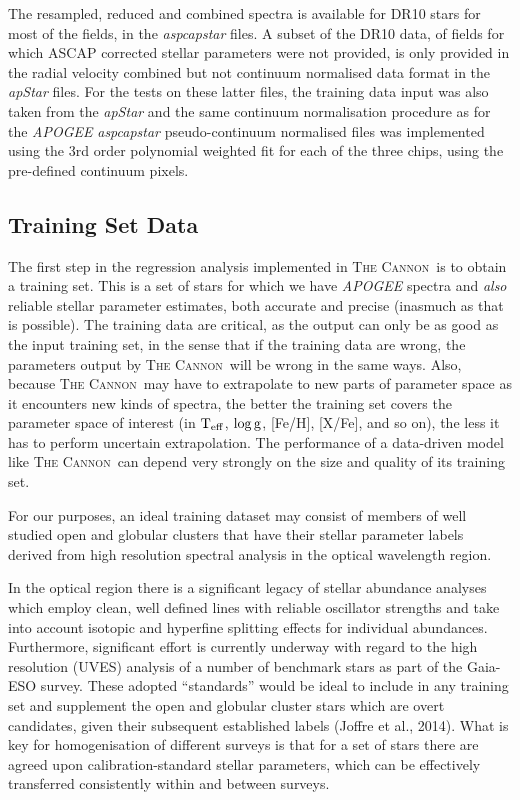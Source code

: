 \documentclass[12pt, preprint]{aastex}
\newcommand{\teff}{\mbox{$\rm T_{eff}$}}
\newcommand{\logg}{\mbox{$\rm \log g$}}
\newcommand{\tc}{\textsc{The Cannon}}
\begin{document}
The resampled, reduced and combined spectra is available for DR10 stars for most of the fields, in the \textit{aspcapstar} files. A subset of the DR10 data, of fields for which ASCAP corrected stellar parameters were not provided, is only provided in the radial velocity combined but not continuum normalised data format in the \textit{apStar} files. For the tests on these latter files, the training data input was also taken from the \textit{apStar} and the same continuum normalisation procedure as for the \textit{APOGEE} \textit{aspcapstar} pseudo-continuum normalised files was implemented using the 3rd order polynomial weighted fit for each of the three chips, using the pre-defined continuum pixels.


\subsection{Training Set Data}

The first step in the regression analysis implemented in \tc\ is to
obtain a training set. This is a set of stars for which we have \textit{APOGEE} spectra and
\emph{also} reliable stellar parameter estimates, both accurate and
precise (inasmuch as that is possible).
The training data are critical, as the output can only be as good as
the input training set, in the sense that if the training data are
wrong, the parameters output by \tc\ will be wrong in the same ways.
Also, because \tc\ may have to extrapolate to new parts of parameter
space as it encounters new kinds of spectra, the better the training
set covers the parameter space of interest (in \teff, \logg, [Fe/H],
[X/Fe], and so on), the less it has to perform uncertain
extrapolation.
The performance of a data-driven model like \tc\ can depend very
strongly on the size and quality of its training set.

For our purposes, an ideal training dataset may consist of members of
well studied open and globular clusters that have their stellar
parameter labels derived from high resolution spectral analysis in the
optical wavelength region.

In the optical region there is a significant legacy of stellar abundance analyses which employ clean, well defined lines with reliable oscillator strengths and take into account isotopic and hyperfine splitting effects for individual abundances. Furthermore, significant effort is currently underway with regard to the high resolution (UVES) analysis of a number of benchmark stars as part of the Gaia-ESO survey. These adopted ``standards'' would be ideal to include in any training set and supplement the open and globular cluster stars which are overt candidates, given their subsequent established labels (Joffre et al., 2014). What is key for homogenisation of different surveys is that for a set of stars there are agreed upon calibration-standard stellar parameters, which can be effectively transferred consistently within and between surveys.  %
\end{document}

